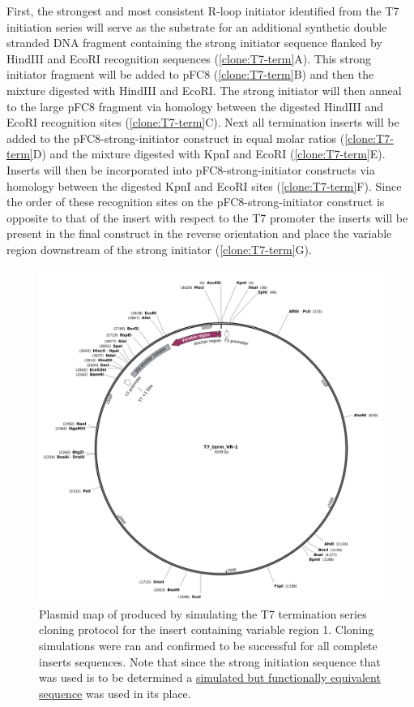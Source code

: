 \documentclass[11pt]{article}
\begin{document}
 First, the strongest and most consistent R-loop initiator identified from the T7 initiation series will serve as the substrate for an additional synthetic double stranded DNA fragment containing the strong initiator sequence flanked by  HindIII and EcoRI recognition sequences (\ref{clone:T7-term}A). This strong initiator fragment will be added to pFC8  (\ref{clone:T7-term}B) and then the mixture digested with HindIII and EcoRI. The strong initiator will then anneal to the large pFC8 fragment via homology between the digested HindIII and EcoRI recognition sites (\ref{clone:T7-term}C). Next all termination inserts will be added to the pFC8-strong-initiator construct in equal molar ratios (\ref{clone:T7-term}D) and the mixture digested with KpnI and EcoRI (\ref{clone:T7-term}E). Inserts will then be incorporated into pFC8-strong-initiator constructs via homology between the digested KpnI and EcoRI sites (\ref{clone:T7-term}F). Since the order of these recognition sites on the pFC8-strong-initiator construct is opposite to that of the insert with respect to the T7 promoter the inserts will be present in the final construct in the reverse orientation and place the variable region downstream of the strong initiator (\ref{clone:T7-term}G). 
 
 \begin{figure}[H]
 	\includegraphics[width=12cm]{images/plasmid_maps/T7_term_VR-1 Map.png}
 	\centering
 	\caption{Plasmid map of produced by simulating the T7 termination series cloning protocol for the insert containing variable region 1. Cloning simulations were ran and confirmed to be successful for all complete inserts sequences. Note that since the strong initiation sequence that was used is to be determined a \href{https://github.com/EthanHolleman/plasmid-VR-design/blob/main/notes/placeholder_strong_initiator.ipynb}{simulated but functionally equivalent sequence} was used in its place.}
 	\label{clone:T7-term-insert-simulated}
 \end{figure}
 
\end{document}

